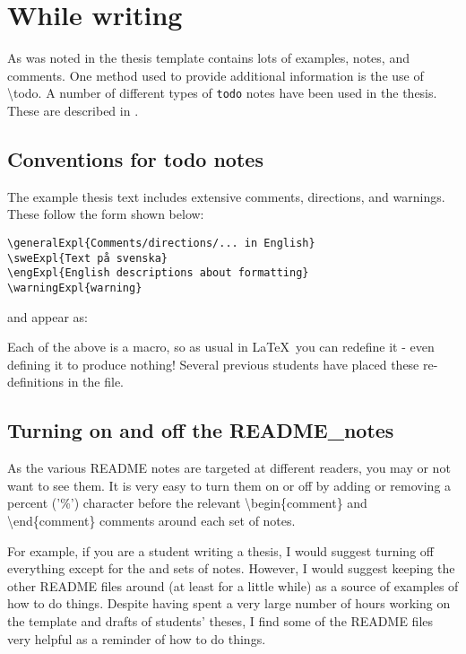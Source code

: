 \section{While writing}
As was noted in  the thesis template contains lots of examples, notes, and comments. One method used to provide additional information is the use of \textbackslash todo. A number of different types of \texttt{todo} notes have been used in the thesis. These are described in .

\subsection{Conventions for todo notes}
\label{sec:todonotes}
The example thesis text includes extensive comments, directions, and warnings. These follow the form shown below:
\begin{lstlisting}
\generalExpl{Comments/directions/... in English}
\sweExpl{Text på svenska}
\engExpl{English descriptions about formatting}
\warningExpl{warning}  
\end{lstlisting}
and appear as:

Each of the above is a macro, so as usual in \LaTeX\ you can redefine it - even defining it to produce nothing! Several previous students have placed these re-definitions in the  file.

\subsection{Turning on and off the README\_notes}
As the various README notes are targeted at different readers, you may or not want to see them. It is very easy to turn them on or off by adding or removing a percent ('\%') character before the relevant \textbackslash begin\{comment\} and \textbackslash end\{comment\} comments around each set of notes.

For example, if you are a student writing a thesis, I would suggest turning off everything except for the  and  sets of notes. However, I would suggest keeping the other README files around (at least for a little while) as a source of examples of how to do things. Despite having spent a very large number of hours working on the template and drafts of students' theses, I find some of the README files very helpful as a reminder of how to do things.


